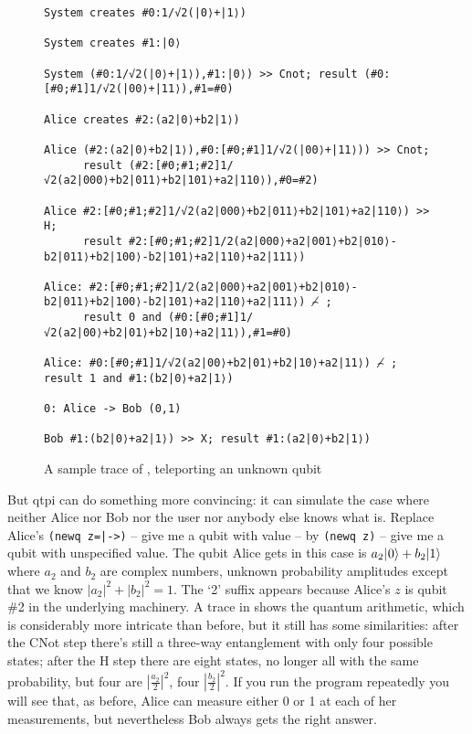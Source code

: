 \documentclass[11pt,a4paper]{article}
\newcommand{\verbtt}[1]{\texttt{\small{}#1}}
\begin{document}
\begin{figure}
\centering
\begin{verbatim}
System creates #0:1/√2(|0⟩+|1⟩)

System creates #1:|0⟩

System (#0:1/√2(|0⟩+|1⟩),#1:|0⟩) >> Cnot; result (#0:[#0;#1]1/√2(|00⟩+|11⟩),#1=#0)

Alice creates #2:(a2|0⟩+b2|1⟩)

Alice (#2:(a2|0⟩+b2|1⟩),#0:[#0;#1]1/√2(|00⟩+|11⟩)) >> Cnot; 
      result (#2:[#0;#1;#2]1/√2(a2|000⟩+b2|011⟩+b2|101⟩+a2|110⟩),#0=#2)

Alice #2:[#0;#1;#2]1/√2(a2|000⟩+b2|011⟩+b2|101⟩+a2|110⟩) >> H; 
      result #2:[#0;#1;#2]1/2(a2|000⟩+a2|001⟩+b2|010⟩-b2|011⟩+b2|100⟩-b2|101⟩+a2|110⟩+a2|111⟩)

Alice: #2:[#0;#1;#2]1/2(a2|000⟩+a2|001⟩+b2|010⟩-b2|011⟩+b2|100⟩-b2|101⟩+a2|110⟩+a2|111⟩) ⌢̸ ; 
      result 0 and (#0:[#0;#1]1/√2(a2|00⟩+b2|01⟩+b2|10⟩+a2|11⟩),#1=#0)

Alice: #0:[#0;#1]1/√2(a2|00⟩+b2|01⟩+b2|10⟩+a2|11⟩) ⌢̸ ; result 1 and #1:(b2|0⟩+a2|1⟩)

0: Alice -> Bob (0,1)

Bob #1:(b2|0⟩+a2|1⟩) >> X; result #1:(a2|0⟩+b2|1⟩)
\end{verbatim}
\caption{A sample trace of , teleporting an unknown qubit}
\end{figure}

But qtpi can do something more convincing: it can simulate the case where neither Alice nor Bob nor the user nor anybody else knows what \bv{\phi} is. Replace Alice's \verbtt{(newq z=|->)} -- give me a qubit with value \minus{} -- by \verbtt{(newq z)} -- give me a qubit with unspecified value. The qubit Alice gets in this case is $a_{2}|\hspace{0.5pt}0\rangle+b_{2}|1\rangle$ where $a_{2}$ and $b_{2}$ are  complex numbers, unknown probability amplitudes except that we know $|a_{2}|^{2}+|b_{2}|^{2}=1$. The `2' suffix appears because Alice's $z$ is qubit \#2 in the underlying machinery. A trace in  shows the quantum arithmetic, which is considerably more intricate than before, but it still has some similarities: after the CNot step there's still a three-way entanglement with only four possible states; after the H step there are eight states, no longer all with the same probability, but four are $|\frac{a_{2}}{2}|^{2}$, four $|\frac{b_{2}}{2}|^{2}$. If you run the program repeatedly you will see that, as before, Alice can measure either 0 or 1 at each of her measurements, but nevertheless Bob always gets the right answer.
\end{document}
